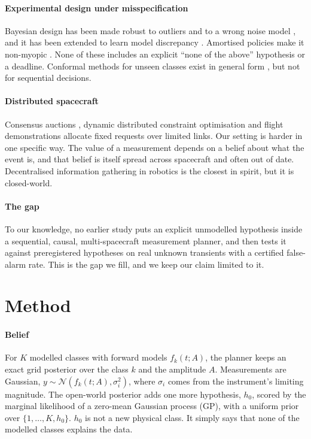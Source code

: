 \documentclass[final,5p,times,twocolumn,authoryear]{elsarticle}
\begin{document}
\paragraph{Experimental design under misspecification} Bayesian design has been made robust to outliers and to a wrong noise model \citep{Barlas2025,Catanach2023}, and it has been extended to learn model discrepancy \citep{Yang2025}. Amortised policies make it non-myopic \citep{Foster2021,Hedman2025}. None of these includes an explicit ``none of the above'' hypothesis or a deadline. Conformal methods for unseen classes exist in general form \citep{Xie2025}, but not for sequential decisions.

\paragraph{Distributed spacecraft} Consensus auctions \citep{Choi2009,Perone2026}, dynamic distributed constraint optimisation \citep{Zilberstein2026} and flight demonstrations \citep{Adams2024} allocate fixed requests over limited links. Our setting is harder in one specific way. The value of a measurement depends on a belief about what the event is, and that belief is itself spread across spacecraft and often out of date. Decentralised information gathering in robotics \citep{Atanasov2015} is the closest in spirit, but it is closed-world.

\paragraph{The gap} To our knowledge, no earlier study puts an explicit unmodelled hypothesis inside a sequential, causal, multi-spacecraft measurement planner, and then tests it against preregistered hypotheses on real unknown transients with a certified false-alarm rate. This is the gap we fill, and we keep our claim limited to it.

\section{Method}\label{sec:method}

\paragraph{Belief} For $K$ modelled classes with forward models $f_k(t;A)$, the planner keeps an exact grid posterior over the class $k$ and the amplitude $A$. Measurements are Gaussian, $y\sim\mathcal N(f_k(t;A),\sigma_i^2)$, where $\sigma_i$ comes from the instrument's limiting magnitude. The open-world posterior adds one more hypothesis, $h_0$, scored by the marginal likelihood of a zero-mean Gaussian process (GP), with a uniform prior over $\{1,\dots,K,h_0\}$. $h_0$ is not a new physical class. It simply says that none of the modelled classes explains the data.
\end{document}
